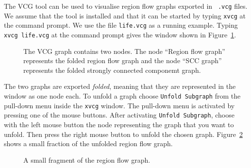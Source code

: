 \documentclass[12pt]{book}
\begin{document}
The 
%
VCG tool can be used to visualise region flow graphs exported in {\tt
  .vcg} files. We assume that the tool is installed and that it can be
started by typing \texttt{xvcg} at the command prompt.  We use the file
\texttt{life.vcg} as a running example. Typing \mbox{\texttt{xvcg
    life.vcg}} at the command prompt gives the window shown in
Figure~\ref{vcg1.fig}.
\begin{figure}
\begin{center}
\end{center}
\caption{The VCG graph contains two nodes. The
  node ``Region flow graph'' represents the folded region flow graph and
  the node ``SCC graph'' represents the folded strongly connected
  componemt graph.}
\label{vcg1.fig}
\end{figure}

The two graphs are exported \emph{folded}, meaning that they are
represented in the window as one node each. To unfold a graph choose
{\tt Unfold Subgraph} from the pull-down menu inside the {\tt xvcg}
window. The pull-down menu is activated by pressing one of the mouse
buttons. After activating {\tt Unfold Subgraph}, choose with the left mouse button the node
representing the graph that you want to unfold. Then press the right
mouse button to unfold the chosen graph. Figure~\ref{vcg2.fig}
shows a small fraction of the unfolded region flow graph.
\begin{figure}
\begin{center}
\end{center}
\caption{A small fragment of the region flow graph.}
\label{vcg2.fig}
\end{figure}
\end{document}
